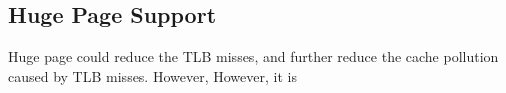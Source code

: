 



\subsection{Huge Page Support}

 
Huge page could reduce the TLB misses, and further reduce the cache pollution caused by TLB misses. However, 
However, it is 




